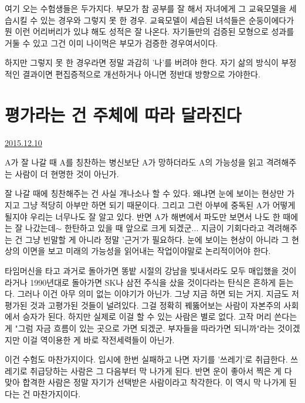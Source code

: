 여기 오는 수험생들은 두가지다.
부모가 참 공부를 잘 해서 자녀에게 그 교육모델을 세습시킬 수 있는 경우와 그렇지 못 한 경우.
교육모델이 세습된 녀석들은 순둥이에다가 뭔 이런 어리버리가 있냐 해도 성적은 잘 나온다.
자기들만의 검증된 모형으로 성과를 거둘 수 있고 그건 이미 나이먹은 부모가 검증한 경우여서이다.
\vspace{5mm}

하지만 그렇지 못 한 경우라면 정말 과감히 '나'를 버려야 한다.
자기 삶의 방식이 부정적인 결과이면 편집증적으로 개선하거나 아니면 정반대 방향으로 가야한다.
\vspace{5mm}






\section{평가라는 건 주체에 따라 달라진다}
\href{https://www.kockoc.com/Apoc/538088}{2015.12.10}

\vspace{5mm}

A가 잘 나갈 때 A를 칭찬하는 병신보단
A가 망하더라도 A의 가능성을 읽고 격려해주는 사람이 더 현명한 것이 아닌가.
\vspace{5mm}

잘 나갈 때에 칭찬해주는 건 사실 개나소나 할 수 있다.
왜냐면 눈에 보이는 현상만 가지고 그냥 적당히 아부만 하면 되기 때문이다.
그리고 그런 아부에 중독된 A가 어떻게 될지야 우리는 너무나도 잘 알고 있다.
반면 A가 해변에서 파도만 보면서 나도 한 때에는 잘 나갔는데$\sim$ 한탄하고 있을 때
앞으로 크게 되겠군... 지금이 기회다라고 격려해주는 건 그냥 빈말할 게 아니라 정말 '근거'가 필요하다.
눈에 보이는 현상이 아니라 그 현상의 이면을 보고 미래의 가능성을 읽어내는 작업이야말로 논리적이어야 한다.
\vspace{5mm}

타임머신을 타고 과거로 돌아가면 똥밭 시절의 강남을 빚내서라도 모두 매입했을 것이라거나
1990년대로 돌아가면 SK나 삼전 주식을 샀을 것이다라는 탄식은 흔하게 듣는다.
그러나 이건 아무 의미 없는 이야기가 아닌가. 그냥 지금 하면 되는 거지.
지금도 저평가된 것과 고평가된 것들이 널려있다. 그걸 정확히 꿰뚫어보는 사람이 자본주의 사회에서 승자가 된다.
하지만 실제로 이걸 할 수 있는 사람은 별로 없다.
고작 머리 쓴다는 게 "그럼 자금 흐름이 있는 곳으로 가면 되겠군. 부자들을 따라가면 되니까"라는 것이겠지만
이걸 역이용한 게 바로 작전세력들이 아닌가.
\vspace{5mm}

이건 수험도 마찬가지이다. 입시에 한번 실패하고 나면 자기를 '쓰레기'로 취급한다.
쓰레기로 취급당하는 사람은 그 다음부터 막 나가게 된다.
반면 운이 좋아서 찍은 게 다 맞아 합격한 사람은 정말 자기가 선택받은 사람이라고 착각한다.
이 역시 막 나가게 된다는 건 마찬가지이다.
\vspace{5mm}

